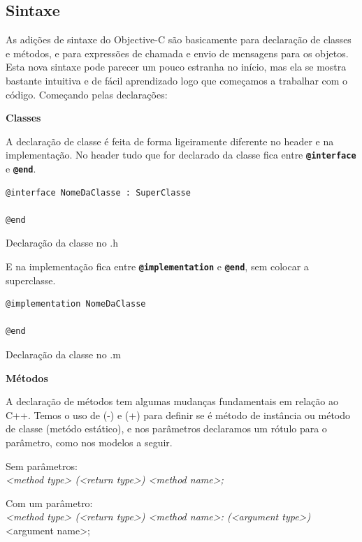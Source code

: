 \documentclass[a4paper,12pt,brazil,doubleside]{book}
\begin{document}
\begin{singlespace}
\subsection{Sintaxe}


As adições de sintaxe do Objective-C são basicamente para declaração de classes e métodos, e para expressões de chamada e envio de mensagens para os objetos. Esta nova sintaxe pode parecer um pouco estranha no início, mas ela se mostra bastante intuitiva e de fácil aprendizado logo que começamos a trabalhar com o código.
Começando pelas declarações:





\textbf{Classes}


A declaração de classe é feita de forma ligeiramente diferente no header e na implementação. No header tudo que for declarado da classe fica entre \texttt{\textbf{@interface}} e \texttt{\textbf{@end}}.

\begin{listing}
\begin{verbatim}
@interface NomeDaClasse : SuperClasse

@end
\end{verbatim}
\caption{Declaração da classe no .h}
\end{listing}


E na implementação fica entre \texttt{\textbf{@implementation}} e \texttt{\textbf{@end}}, sem colocar a superclasse.

\begin{listing}
\begin{verbatim}
@implementation NomeDaClasse

@end
\end{verbatim}
\caption{Declaração da classe no .m}
\end{listing}


\textbf{Métodos}


A declaração de métodos tem algumas mudanças fundamentais em relação ao C++. Temos o uso de (-) e (+) para definir se é método de instância ou método de classe (metódo estático), e nos parâmetros declaramos um rótulo para o parâmetro, como nos modelos a seguir.


Sem parâmetros:\\
\emph{<method type> (<return type>) <method name>;}


Com um parâmetro:\\
\emph{<method type> (<return type>) <method name>: (<argument type>)} <argument name>;



\end{singlespace}
\end{document}
